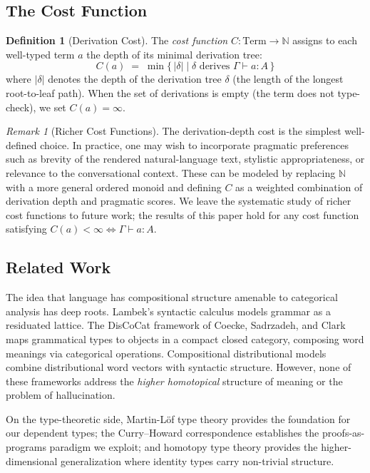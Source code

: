 \documentclass[11pt,a4paper]{article}
\theoremstyle{plain}
\theoremstyle{definition}
\newtheorem{definition}[theorem]{Definition}
\theoremstyle{remark}
\newtheorem{remark}[theorem]{Remark}
\begin{document}
\subsection{The Cost Function}\label{subsec:cost}

\begin{definition}[Derivation Cost]\label{def:cost}
The \emph{cost function} $C : \mathrm{Term} \to \mathbb{N}$ assigns to each well-typed term $a$ the depth of its minimal derivation tree:
\[
  C(a) \;=\; \min\bigl\{\, |\delta| \;\big|\; \delta \text{ derives } \Gamma \vdash a : A \,\bigr\}
\]
where $|\delta|$ denotes the depth of the derivation tree $\delta$ (the length of the longest root-to-leaf path).
When the set of derivations is empty (the term does not type-check), we set $C(a) = \infty$.
\end{definition}

\begin{remark}[Richer Cost Functions]\label{rem:richer-cost}
The derivation-depth cost is the simplest well-defined choice.
In practice, one may wish to incorporate pragmatic preferences such as brevity of the rendered natural-language text, stylistic appropriateness, or relevance to the conversational context.
These can be modeled by replacing $\mathbb{N}$ with a more general ordered monoid and defining $C$ as a weighted combination of derivation depth and pragmatic scores.
We leave the systematic study of richer cost functions to future work; the results of this paper hold for any cost function satisfying $C(a) < \infty \iff \Gamma \vdash a : A$.
\end{remark}

\subsection{Related Work}

The idea that language has compositional structure amenable to categorical analysis has deep roots.
Lambek's syntactic calculus \cite{lambek1958} models grammar as a residuated lattice.
The DisCoCat framework of Coecke, Sadrzadeh, and Clark \cite{coecke2010mathematical} maps grammatical types to objects in a compact closed category, composing word meanings via categorical operations.
Compositional distributional models \cite{baroni2014frege} combine distributional word vectors with syntactic structure.
However, none of these frameworks address the \emph{higher homotopical} structure of meaning or the problem of hallucination.

On the type-theoretic side, Martin-L\"of type theory \cite{martinlof1984} provides the foundation for our dependent types; the Curry--Howard correspondence \cite{howard1980, sorensen2006} establishes the proofs-as-programs paradigm we exploit; and homotopy type theory \cite{hottbook} provides the higher-dimensional generalization where identity types carry non-trivial structure.
\end{document}
